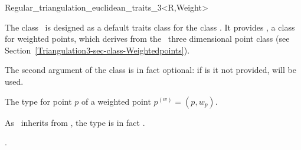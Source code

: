 

\begin{ccRefClass}{Regular_triangulation_euclidean_traits_3<R,Weight>}  %


\ccDefinition
  
The class \ccRefName\ is designed as a default traits class for the
class . It provides
, a class for weighted points, which derives from 
the \cgal\ three dimensional point class (see
Section~\ref{Triangulation3-sec-class-Weightedpoints}).

The second argument  of the class
 is in fact
optional: if is it not provided,  will be used.


\ccIsModel
{}


\ccTypes
{}

{The type for point $p$ of a weighted point ${p}^{(w)}=(p,w_p)$.}
\ccGlue
{}

As \ccClassTemplateName\ inherits from
, the  type is in
fact .

\ccSeeAlso

.



\end{ccRefClass}


